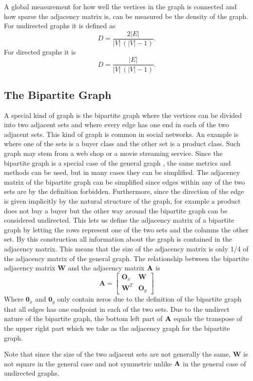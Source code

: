 A global measurement for how well the vertices in the graph is connected and how sparse the adjacency matrix is, can be measured be the density of the graph. For undirected graphs it is defined as\cite{density}
$$D =  \frac{2|E|}{|V|\,(|V|-1)}.$$
For directed graphs it is
$$D = \frac{|E|}{|V|\,(|V|-1)}.$$

\subsection{The Bipartite Graph}\label{subsec:bigraph}
A special kind of graph is the bipartite graph where the vertices can be divided into two adjacent sets and where every edge has one end in each of the two adjacent sets. This kind of graph is common in social networks. An example is where one of the sets is a buyer class and the other set is a product class. Such graph may stem from a web shop or a movie streaming service. Since the bipartite graph is a special case of the general graph \graph, the same metrics and methods can be used, but in many cases they can be simplified. The adjacency matrix of the bipartite graph can be simplified since edges within any of the two sets are by the definition forbidden. Furthermore, since the direction of the edge is given implicitly by the natural structure of the graph, for example a product does not buy a buyer but the other way around the bipartite graph can be considered undirected. This lets us define the adjacency matrix of a bipartite graph by letting the rows represent one of the two sets and the columns the other set. By this construction all information about the graph is contained in the adjacency matrix. This means that the size of the adjacency matrix is only 1/4 of the adjacency matrix of the general graph. The relationship between the bipartite adjacency matrix $\textbf{W}$ and the adjacency matrix $\textbf{A}$ is
$$
\textbf{A} = \left[
\begin{matrix}
  \textbf{O}_x & \textbf{W} \\
  \textbf{W}^T & \textbf{O}_y
\end{matrix}
\right]
$$
Where $\textbf{0}_x$ and $\textbf{0}_y$ only contain zeros due to the definition of the bipartite graph that all edges has one endpoint in each of the two sets. Due to the undirect nature of the bipartite graph, the bottom left part of $\textbf{A}$ equals the transpose of the upper right part which we take as the adjacency graph for the bipartite graph.

Note that since the size of the two adjacent sets are not generally the same, $\textbf{W}$ is not square in the general case and not symmetric unlike $\textbf{A}$ in the general case of undirected graphs.

